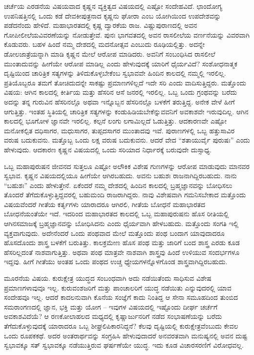 ಚರ್ಚೆಯ ಎರಡನೆಯ ವಿಷಯವಾದ ಕೃಷ್ಣನ ವ್ಯಕ್ತಿತ್ವದ ವಿಷಯದಲ್ಲಿ ಎಷ್ಟೋ ಸಂದೇಹವಿದೆ. ಛಾಂದೋಗ್ಯ ಉಪನಿಷತ್ತಿನಲ್ಲಿ ಒಂದು ಕಡೆ ದೇವಕೀಪುತ್ರನಾದ ಕೃಷ್ಣನು ಘೋರಾ ಎಂಬ ಯೋಗಿಯಿಂದ ಉಪದೇಶವನ್ನು ಪಡೆದನೆಂದು ಹೇಳಿದೆ. ಮಹಾ\-ಭಾರತದಲ್ಲಿ ಕೃಷ್ಣ ದ್ವಾರಕೆಯ ರಾಜ. ವಿಷ್ಣುಪುರಾಣದಲ್ಲಿ ಅವನ ಗೋಪೀಲೀಲೆಯ\break ವಿವರಣೆಯನ್ನು ನೋಡುತ್ತೇವೆ. ಪುನಃ ಭಾಗವತದಲ್ಲಿ ಅವನ ರಾಸಲೀಲೆಯ ವರ್ಣನೆಯನ್ನು ವಿವರವಾಗಿ ಕೊಡುವರು. ಬಹಳ ಹಿಂದೆ ನಮ್ಮ ದೇಶದಲ್ಲಿ ಮದನೋತ್ಸವ ಎಂಬುದು ರೂಢಿಯಲ್ಲಿತ್ತು. ಅದನ್ನೇ ಡೋಲಜಾತ್ರೆಯನ್ನಾಗಿ ಮಾಡಿ ಕೃಷ್ಣನ ಮೇಲೆ ಆರೋಪ ಮಾಡಿದರು. ಅವನಿಗೆ ಸಂಬಂಧಿಸಿದ ರಾಸಲೀಲೆ ಮುಂತಾದುವನ್ನು ಹೀಗೆಯೇ ಆರೋಪ ಮಾಡಿಲ್ಲ ಎಂದು ಹೇಳುವುದಕ್ಕೆ ಯಾರಿಗೆ ಧೈರ್ಯವಿದೆ? ಸಂಶೋಧನಾತ್ಮಕ ದೃಷ್ಟಿಯಿಂದ ಚಾರಿತ್ರಿಕ ಸತ್ಯಗಳನ್ನು ತಿಳಿದುಕೊಳ್ಳಬೇಕೆಂಬ ಸ್ವಭಾವವೇ ಹಿಂದಿನ ಕಾಲದಲ್ಲಿ ನಮ್ಮಲ್ಲಿ ಇರಲಿಲ್ಲ. ಪ್ರತಿಯೊಬ್ಬರೂ ತಮಗೆ ತೋಚಿದುದನ್ನೇ ಸಾಕಷ್ಟು ಪ್ರಮಾಣಗಳಿಲ್ಲದೆ ಇದೇ ಸರಿ ಎಂದು ವಾದಿಸುತ್ತಿದ್ದರು. ಮತ್ತೊಂದು ವಿಷಯ: ಆಗಿನ ಕಾಲದಲ್ಲಿ ಕೀರ್ತಿಯ ಮತ್ತು ಹೆಸರಿನ ಆಸೆ ಜನರಲ್ಲಿ ಇರಲಿಲ್ಲ. ಒಬ್ಬ ಒಂದು ಗ್ರಂಥವನ್ನು ಬರೆದು ಅದನ್ನು ತನ್ನ ಗುರುವಿನ ಹೆಸರಿನಲ್ಲೊ ಅಥವಾ ಇನ್ನೊಬ್ಬನ ಹೆಸರಿನಲ್ಲೊ ಬಳಕೆಗೆ ತರುತ್ತಿದ್ದ. ಅನೇಕ ವೇಳೆ ಹೀಗೆ ಆಗುತ್ತಿತ್ತು. ಇಂತಹ ಸ್ಥಿತಿಯಲ್ಲಿ ಚಾರಿತ್ರಿಕ ಸತ್ಯಗಳನ್ನು ಕಂಡುಹಿಡಿಯಬೇಕೆನ್ನುವವನಿಗೆ ಅವಕಾಶವೇ ಇರುವುದಿಲ್ಲ. ಆಗಿನ ಕಾಲದಲ್ಲಿ ಭೂಗೋಳ ಜ್ಞಾನವೇ ಇರಲಿಲ್ಲ. ಕಲ್ಪನೆ ಲಂಗು ಲಗಾಮಿಲ್ಲದೆ ಓಡುತ್ತಿತ್ತು. ಆದಕಾರಣವೇ ಎಷ್ಟೋ ಮನೋಕಲ್ಪಿತ ದಧಿಸಾಗರ, ಮಧುಸಾಗರ, ತುಪ್ಪದಸಾಗರ ಮುಂತಾದವು ಇವೆ. ಪುರಾಣಗಳಲ್ಲಿ ಒಬ್ಬ ಹತ್ತುಸಾವಿರ ವರುಷ ಬದುಕುವನು. ಮತ್ತೊಬ್ಬ ಒಂದು ಲಕ್ಷ ವರುಷ ಬದುಕುವನು. ಆದರೆ ವೇದ “ಶತಾಯುರ್ವೈ ಪುರುಷಃ” ಎಂದು ಹೇಳುವುದು. ಆದಕಾರಣ ಕೃಷ್ಣನ ವಿಷಯದಲ್ಲಿ ಒಂದು ಸರಿಯಾದ ನಿರ್ಧಾರಕ್ಕೆ ಬರುವುದೇ ದುಸ್ಸಾಧ್ಯ.

ಒಬ್ಬ ಮಹಾಪುರುಷನ ಜೀವನದ ಸುತ್ತಲೂ ಎಷ್ಟೋ ಅಲೌಕಿಕ ವಿಶೇಷ ಗುಣಗಳನ್ನು ಆರೋಪ ಮಾಡುವುದು ಮಾನವರ ಸ್ವಭಾವ. ಕೃಷ್ಣನ ವಿಷಯದಲ್ಲಿಯೂ ಹೀಗೆಯೇ ಆಗಿರಬಹುದು. ಅವನು ಬಹುಶಃ ರಾಜನಾಗಿದ್ದಿರಬಹುದು. ನಾನು “ಬಹುಶಃ” ಎಂದು ಹೇಳುತ್ತೇನೆ. ಏಕೆಂದರೆ ನಮ್ಮ ದೇಶದಲ್ಲಿ ಹಿಂದಿನ ಕಾಲದಲ್ಲಿ ಬ್ರಹ್ಮಜ್ಞಾನವನ್ನು ಬೋಧಿಸಲು ತೊಂದರೆ ತೆಗೆದುಕೊಳ್ಳುತ್ತಿದ್ದವರಲ್ಲಿ ಬಹುಮಂದಿ ರಾಜರಾಗಿದ್ದರು. ನಾವು ವಿಶೇಷವಾಗಿ ಗಮನಿಸಬೇಕಾದ ಮತ್ತೊಂದು ವಿಷಯವೆಂದರೆ ಗೀತೆಯ ಕರ್ತೃಗಳು ಯಾರಾದರೂ ಆಗಿರಲಿ, ಗೀತೆಯ ಬೋಧನೆ ಮಹಾಭಾರತದ ಬೋಧನೆಯಂತೆಯೇ ಇದೆ. ಇದರಿಂದ ಮಹಾಭಾರತದ ಕಾಲದಲ್ಲಿ ಒಬ್ಬ ಮಹಾಪುರುಷನು ಹೊಸ ರೀತಿಯಲ್ಲಿ ಆಗಿನ\break ಸಮಾಜಕ್ಕೆ ಬ್ರಹ್ಮಜ್ಞಾನವನ್ನು ಬೋಧಿಸಿದನು ಎಂದು ಧೈರ್ಯವಾಗಿ ಹೇಳಬಹುದು. ಮತ್ತೊಂದು ಸಂಗತಿ ಇಲ್ಲಿ ವ್ಯಕ್ತವಾಗುವುದು. ಅದೇನೆಂದರೆ ಒಂದು ಪಂಥವಾದ ಮೇಲೆ ಮತ್ತೊಂದು ಪಂಥ ಬಂದಾಗ ಯಾವುದಾದರೂ ಹೊಸದೊಂದು ಶಾಸ್ತ್ರ ಬಳಕೆಗೆ ಬರುತಿತ್ತು. ಕಾಲಕ್ರಮೇಣ ಹೊಸ ಪಂಥ ಮತ್ತು ಜಾರಿಗೆ ಬಂದ ಶಾಸ್ತ್ರ ಎರಡು ಕೂಡ ಹೆಸರಿಲ್ಲದಂತೆ ನಾಶವಾಗುತ್ತಿತ್ತು. ಅಥವಾ ಪಂಥ ಮಾತ್ರವೇ ನಾಶವಾಗಿ ಶಾಸ್ತ್ರವು ಹಿಂದೆ ಉಳಿಯುವ ಸಂದರ್ಭಗಳೂ ಇದ್ದವು. ಹೀಗೆ ಗೀತೆಯು ಅಂತಹ ಒಂದು ಪಂಥದ ಉಚ್ಚ ಧ್ಯೇಯಗಳನ್ನೊಳಗೊಂಡ ಶಾಸ್ತ್ರವಾಗಿದ್ದಿರಬಹುದು.

ಮೂರನೆಯ ವಿಷಯ. ಕುರುಕ್ಷೇತ್ರ ಯುದ್ಧದ ಸಂಬಂಧವಾಗಿ ಅದು ನಡೆಯಿತೆಂದು ಸಾಧಿಸುವ ವಿಶೇಷ ಪ್ರಮಾಣಗಳಾವುವೂ ಇಲ್ಲ. ಕುರುವಂಶಜರಿಗೆ ಮತ್ತು ಪಾಂಚಾಲರಿಗೆ ಯುದ್ಧ ನಡೆಯಿತು ಎನ್ನುವುದರಲ್ಲಿ ಯಾವ ಸಂದೇಹವೂ ಇಲ್ಲ. ಆದರೆ ಕಾದಲನುವಾಗಿ ಕೊನೆಯ ಸಂಜ್ಞೆಗೆ ಕಾದು ನಿಂತಿದ್ದ ಆ ಸೇನಾ ಸಮೂಹದಿಂದ ತುಂಬಿದ ಸಮರಾಂಗಣದಲ್ಲಿ ಜ್ಞಾನ, ಭಕ್ತಿ ಮತ್ತು ಯೋಗ – ಇವುಗಳ ವಿಷಯದಲ್ಲಿ ಇಷ್ಟೊಂದು ದೀರ್ಘ ಚರ್ಚೆಗೆ ಅವಕಾಶವಿದೆಯೆ? ಆ ರಣಕೋಲಾಹಲದ ಮಧ್ಯದಲ್ಲಿ ಕೃಷ್ಣಾರ್ಜುನರಿಗೆ ನಡೆದ ಸಂಭಾಷಣೆಯನ್ನು ಬರೆದು ತೆಗೆದುಕೊಳ್ಳುವುದಕ್ಕೆ ಯಾರಾದರೂ ಒಬ್ಬ ಶೀಘ್ರಲಿಪಿಕಾರನಿದ್ದನೆ? ಕೆಲವು ದೃಷ್ಟಿಯಲ್ಲಿ ಕುರುಕ್ಷೇತ್ರವೆಂಬುದು ಕೇವಲ ಒಂದು ರೂಪಕಕಥೆ. ಅದರ ಅಂತರಾರ್ಥವನ್ನು ಸಂಗ್ರಹಿಸಿ ಹೇಳುವುದಾದರೆ ಅನವರತವಾಗಿ ಮನುಷ್ಯನಲ್ಲಿ ಅವನ ದುಷ್ಟ ಸ್ವಭಾವಕ್ಕೂ ಸತ್​ ಸ್ವಭಾವಕ್ಕೂ ನಡೆಯುತ್ತಿರುವ ಘರ್ಷಣೆಯೇ ಯುದ್ಧ. ಇದು ಕೂಡ ವಿಚಾರಸರಣಿಗೆ ವಿರೋಧವಲ್ಲ.

